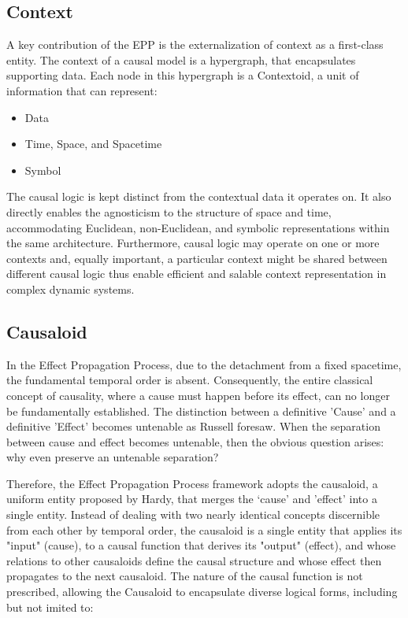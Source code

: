%
%
\subsection{Context}
\label{sec:epp_context}

A key contribution of the EPP is the externalization of context as a first-class entity.
The context of a causal model is a hypergraph, that encapsulates supporting data. 
Each node in this hypergraph is a Contextoid, a unit of information that can represent:

\begin{itemize}
	\item Data
	\item Time, Space, and Spacetime
	\item Symbol 
\end{itemize}

The causal logic is kept distinct from the contextual data it operates on. It also directly enables the  agnosticism to the structure of space and time, accommodating Euclidean, non-Euclidean, and symbolic representations within the same architecture. Furthermore,  causal logic  may operate on one or more contexts and, equally important, a particular context might be shared between different causal logic thus enable efficient and salable context representation in complex dynamic systems. 

\newpage

%
%
\subsection{Causaloid}
\label{sec:epp_causaloid}

In the Effect Propagation Process, due to the detachment from a fixed spacetime, the fundamental temporal order is absent. Consequently, the entire classical concept of causality, where a cause must happen before its effect, can no longer be fundamentally established. The distinction between a definitive 'Cause' and a definitive 'Effect' becomes untenable as Russell foresaw. When the separation between cause and effect becomes untenable, then the obvious question arises: why even preserve an untenable separation?

Therefore, the Effect Propagation Process framework adopts the causaloid, a uniform entity proposed by Hardy\cite{HardyDynamicCausalStructure}, that merges the ‘cause' and 'effect' into a single entity. Instead of dealing with two nearly identical concepts discernible from each other by temporal order, the causaloid is a single entity that applies its "input" (cause), to a causal function that derives its "output" (effect), and whose relations to other causaloids define the causal structure and whose effect then propagates to the next causaloid. The nature of the causal function is not prescribed, allowing the Causaloid to encapsulate diverse logical forms, including but not imited to:

